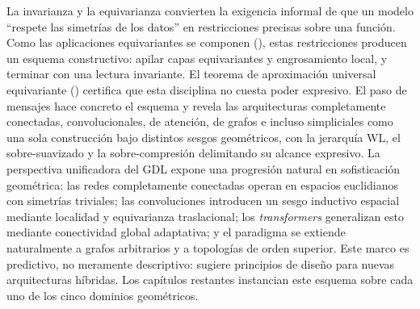 La invarianza y la equivarianza convierten la exigencia informal de que un modelo
``respete las simetr\'ias de los datos'' en restricciones precisas sobre una
funci\'on. Como las aplicaciones equivariantes se componen
(), estas restricciones producen un esquema
constructivo: apilar capas equivariantes y engrosamiento local, y terminar con
una lectura invariante. El teorema de aproximaci\'on universal equivariante
() certifica que esta disciplina no cuesta poder
expresivo. El paso de mensajes hace concreto el esquema y revela las
arquitecturas completamente conectadas, convolucionales, de atenci\'on, de grafos
e incluso simpliciales como una sola construcci\'on bajo distintos sesgos
geom\'etricos, con la jerarqu\'ia WL, el sobre-suavizado y la sobre-compresi\'on
delimitando su alcance expresivo. La perspectiva unificadora del GDL expone una
progresi\'on natural en sofisticaci\'on geom\'etrica: las redes completamente
conectadas operan en espacios euclidianos con simetr\'ias triviales; las
convoluciones introducen un sesgo inductivo espacial mediante localidad y
equivarianza traslacional; los \emph{transformers} generalizan esto mediante
conectividad global adaptativa; y el paradigma se extiende naturalmente a grafos
arbitrarios y a topolog\'ias de orden superior. Este marco es predictivo, no
meramente descriptivo: sugiere principios de dise\~no para nuevas arquitecturas
h\'ibridas. Los cap\'itulos restantes instancian este esquema sobre cada uno de
los cinco dominios geom\'etricos.
